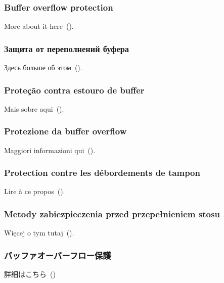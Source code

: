 \ifdefined\ENGLISH
\subsubsection{Buffer overflow protection}

More about it here~().
\fi

\ifdefined\RUSSIAN
\subsubsection{Защита от переполнений буфера}

Здесь больше об этом~().
\fi

\ifdefined\BRAZILIAN
\subsubsection{Proteção contra estouro de buffer}

Mais sobre aqui~().
\fi

\ifdefined\ITALIAN
\subsubsection{Protezione da buffer overflow}

Maggiori informazioni qui~().
\fi

\ifdefined\FRENCH
\subsubsection{Protection contre les débordements de tampon}

Lire à ce propos~().
\fi


\ifdefined\POLISH
\subsubsection{Metody zabiezpieczenia przed przepełnieniem stosu}

Więcej o tym tutaj~().
\fi

\ifdefined\JAPANESE
\subsubsection{バッファオーバーフロー保護}

詳細はこちら~()
\fi